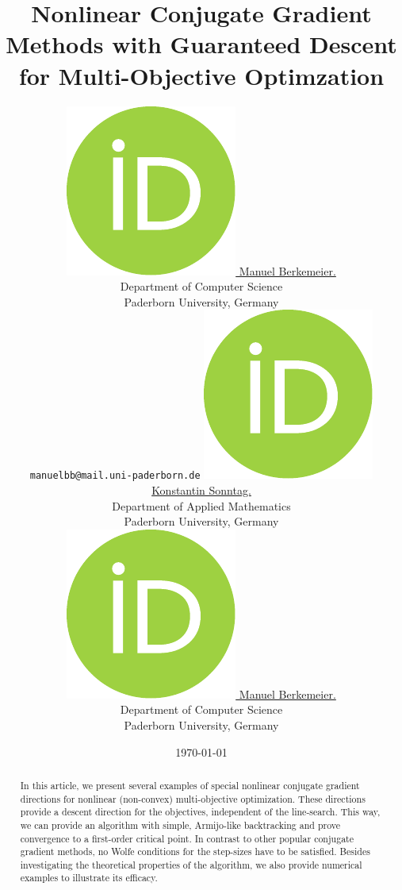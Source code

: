 \documentclass{article}
\title{
	Nonlinear Conjugate Gradient Methods with
	Guaranteed Descent for Multi-Objective Optimzation
}
\date{\today}	%
\author{%
	\href{https://orcid.org/0000-0002-3958-2277}{%
		\includegraphics[scale=0.06]{orcid.pdf}%
		\hspace{1mm}Manuel Berkemeier.%
	}\\
	Department of Computer Science\\
	Paderborn University, Germany\\
	\texttt{manuelbb@mail.uni-paderborn.de}
	\And
	\href{https://orcid.org/0000-0003-3384-3496}{%
		\includegraphics[scale=0.06]{orcid.pdf}%
		\hspace{1mm}Konstantin Sonntag.%
	}\\
	Department of Applied Mathematics\\
	Paderborn University, Germany\\
	\And
	\href{https://orcid.org/0000-0002-3389-793X}{%
		\includegraphics[scale=0.06]{orcid.pdf}%
		\hspace{1mm}Manuel Berkemeier.%
	}\\
	Department of Computer Science\\
	Paderborn University, Germany\\
}%
\theoremstyle{plain}
\theoremstyle{definition}
\begin{document}
\maketitle


\begin{abstract}
In this article, we present several examples of special nonlinear conjugate
gradient directions for nonlinear (non-convex) multi-objective optimization.
These directions provide a descent direction for the objectives, independent
of the line-search.
This way, we can provide an algorithm with simple, Armijo-like backtracking 
and prove convergence to a first-order critical point.
In contrast to other popular conjugate gradient methods, no Wolfe 
conditions for the step-sizes have to be satisfied.
Besides investigating the theoretical properties of the algorithm, 
we also provide numerical examples to illustrate its efficacy.
\end{abstract}

\listoftodos
\end{document}
